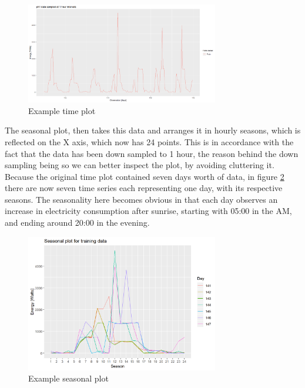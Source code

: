 \documentclass[12pt,a4paper,titlepage]{report}
\begin{document}
\begin{figure}[h]
    \centering
    \includegraphics[width=0.75\textwidth]{d1hrsph1timeplot.png}
    \caption{Example time plot}
    \label{exampletimeplot}
\end{figure}

The seasonal plot, then takes this data and arranges it in hourly seasons, which is reflected on the X axis, which now has 24 points. This is in accordance with the fact that the data has been down sampled to 1 hour, the reason behind the down sampling being so we can better inspect the plot, by avoiding cluttering it. Because the original time plot contained seven days worth of data, in figure \ref{exampleseasonalplot} there are now seven time series each representing one day, with its respective seasons. The seasonality here becomes obvious in that each day observes an increase in electricity consumption after sunrise, starting with 05:00 in the AM, and ending around 20:00 in the evening.

\begin{figure}[h]
    \centering
    \includegraphics[width=0.75\textwidth]{d1hrsph1seasonalplot}
    \caption{Example seasonal plot}
    \label{exampleseasonalplot}
\end{figure}
\end{document}
